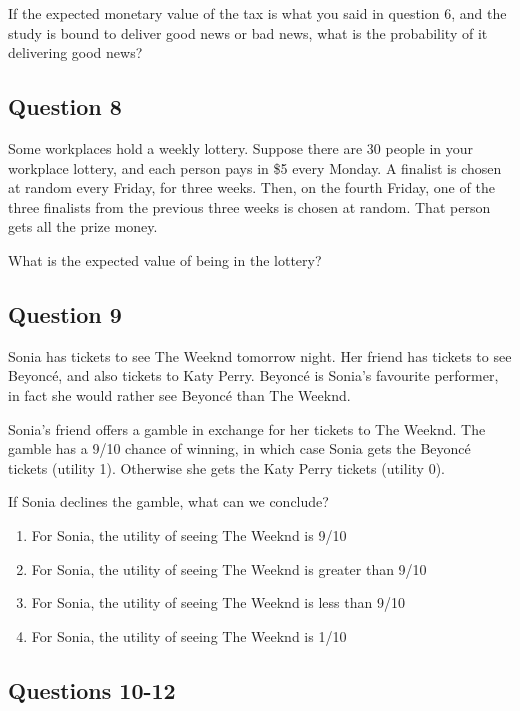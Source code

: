 \documentclass[
  11pt,
]{article}
\providecommand{\tightlist}{%
  \setlength{\itemsep}{0pt}\setlength{\parskip}{0pt}}
\begin{document}
If the expected monetary value of the tax is what you said in question
6, and the study is bound to deliver good news or bad news, what is the
probability of it delivering good news?

\hypertarget{question-8}{%
\subsection{Question 8}\label{question-8}}

Some workplaces hold a weekly lottery. Suppose there are 30 people in
your workplace lottery, and each person pays in \$5 every Monday. A
finalist is chosen at random every Friday, for three weeks. Then, on the
fourth Friday, one of the three finalists from the previous three weeks
is chosen at random. That person gets all the prize money.

What is the expected value of being in the lottery?

\newpage

\hypertarget{question-9}{%
\subsection{Question 9}\label{question-9}}

Sonia has tickets to see The Weeknd tomorrow night. Her friend has
tickets to see Beyoncé, and also tickets to Katy Perry. Beyoncé is
Sonia's favourite performer, in fact she would rather see Beyoncé than
The Weeknd.

Sonia's friend offers a gamble in exchange for her tickets to The
Weeknd. The gamble has a 9/10 chance of winning, in which case Sonia
gets the Beyoncé tickets (utility 1). Otherwise she gets the Katy Perry
tickets (utility 0).

If Sonia declines the gamble, what can we conclude?

\begin{enumerate}
\def\labelenumi{\alph{enumi}.}
\tightlist
\item
  For Sonia, the utility of seeing The Weeknd is 9/10
\item
  For Sonia, the utility of seeing The Weeknd is greater than 9/10
\item
  For Sonia, the utility of seeing The Weeknd is less than 9/10
\item
  For Sonia, the utility of seeing The Weeknd is 1/10
\end{enumerate}

\hypertarget{questions-10-12}{%
\subsection{Questions 10-12}\label{questions-10-12}}
\end{document}
